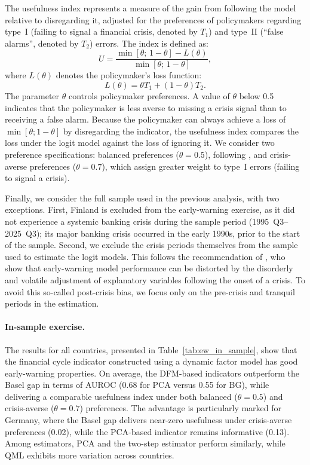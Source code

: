 The usefulness index represents a measure of the gain from following the model relative to disregarding it, adjusted for the preferences of policymakers regarding type~I (failing to signal a financial crisis, denoted by $T_1$) and type~II (``false alarms'', denoted by $T_2$) errors. The index is defined as:
\begin{equation}
    U = \frac{\min[\theta;\, 1- \theta] - L(\theta)}{\min[\theta;\, 1- \theta]},
\end{equation}
where $L(\theta)$ denotes the policymaker's loss function:
\begin{equation}
   L(\theta) = \theta T_1 + (1- \theta) T_2.
\end{equation}
The parameter $\theta$ controls policymaker preferences. A value of $\theta$ below 0.5 indicates that the policymaker is less averse to missing a crisis signal than to receiving a false alarm. Because the policymaker can always achieve a loss of $\min[\theta; 1-\theta]$ by disregarding the indicator, the usefulness index compares the loss under the logit model against the loss of ignoring it. We consider two preference specifications: balanced preferences ($\theta = 0.5$), following \citet{lang2019anticipating}, and crisis-averse preferences ($\theta = 0.7$), which assign greater weight to type~I errors (failing to signal a crisis).

Finally, we consider the full sample used in the previous analysis, with two exceptions. First, Finland is excluded from the early-warning exercise, as it did not experience a systemic banking crisis during the sample period (1995~Q3--2025~Q3); its major banking crisis occurred in the early 1990s, prior to the start of the sample. Second, we exclude the crisis periods themselves from the sample used to estimate the logit models. This follows the recommendation of \citet{bussiere2006towards}, who show that early-warning model performance can be distorted by the disorderly and volatile adjustment of explanatory variables following the onset of a crisis. To avoid this so-called post-crisis bias, we focus only on the pre-crisis and tranquil periods in the estimation.

\paragraph{In-sample exercise.}
The results for all countries, presented in Table~\ref{tab:ew_in_sample}, show that the financial cycle indicator constructed using a dynamic factor model has good early-warning properties. On average, the DFM-based indicators outperform the Basel gap in terms of AUROC (0.68 for PCA versus 0.55 for BG), while delivering a comparable usefulness index under both balanced ($\theta=0.5$) and crisis-averse ($\theta=0.7$) preferences. The advantage is particularly marked for Germany, where the Basel gap delivers near-zero usefulness under crisis-averse preferences (0.02), while the PCA-based indicator remains informative (0.13). Among estimators, PCA and the two-step estimator perform similarly, while QML exhibits more variation across countries.

